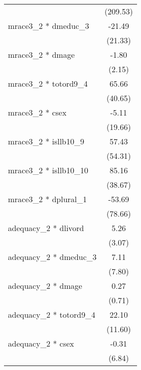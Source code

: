 {\begin{tabular}{l*{1}{c}}
                                                  &    (209.53)\\
mrace3\_2 * dmeduc\_3                               &      -21.49\\
                                                  &     (21.33)\\
mrace3\_2 * dmage                                  &       -1.80\\
                                                  &      (2.15)\\
mrace3\_2 * totord9\_4                              &       65.66\\
                                                  &     (40.65)\\
mrace3\_2 * csex                                   &       -5.11\\
                                                  &     (19.66)\\
mrace3\_2 * isllb10\_9                              &       57.43\\
                                                  &     (54.31)\\
mrace3\_2 * isllb10\_10                             &       85.16\\
                                                  &     (38.67)\\
mrace3\_2 * dplural\_1                              &      -53.69\\
                                                  &     (78.66)\\
adequacy\_2 * dlivord                              &        5.26\\
                                                  &      (3.07)\\
adequacy\_2 * dmeduc\_3                             &        7.11\\
                                                  &      (7.80)\\
adequacy\_2 * dmage                                &        0.27\\
                                                  &      (0.71)\\
adequacy\_2 * totord9\_4                            &       22.10\\
                                                  &     (11.60)\\
adequacy\_2 * csex                                 &       -0.31\\
                                                  &      (6.84)\\

\end{tabular}}

